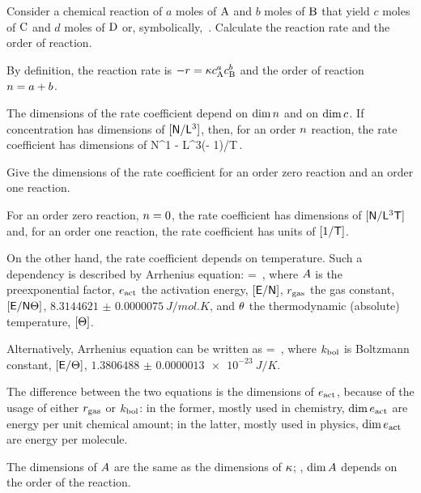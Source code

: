 \begin{example}
Consider a chemical reaction of $a$ moles of $\ce A$ and $b$ moles of $\ce B$ that yield $c$ moles of $\ce C$ and $d$ moles of $\ce D$ or, symbolically,
\beq
{}\,.
\eeq
Calculate the reaction rate and the order of reaction.
\end{example}

\begin{solution}
By definition, the reaction rate is $-\rrate = \krcoeff\conc A^a\conc B^b$ and the order of reaction $n = a + b$.
\end{solution}

The dimensions of the rate coefficient depend on $\dim n$ and on $\dim\conc{}$. If concentration has dimensions of $[\mathsf{N}/\mathsf{L}^3]$, then, for an order $n$ reaction, the rate coefficient has dimensions of 
\beq
\phdim N^{1 - \rorder}\phdim L^{3(\rorder - 1)}/\phdim T\,.
\eeq

\begin{example}
Give the dimensions of the rate coefficient for an order zero reaction and an order one reaction.
\end{example}

\begin{solution}
For an order zero reaction, $n = 0$, the rate coefficient has dimensions of $[\mathsf{N}/\mathsf{L}^3\mathsf{T}]$ and, for an order one reaction, the rate coefficient has units of $[1/\mathsf{T}]$.
\end{solution}

On the other hand, the rate coefficient depends on temperature. Such a dependency is described by Arrhenius equation:
\beq
\krcoeff\vat\temp = \freqfact\exp{}\,,
\eeq
where $A$ is the preexponential factor, $e_\text{act}$ the activation energy, $[\mathsf{E}/\mathsf{N}]$, $r_\text{gas}$ the gas constant, $[\mathsf{E}/\mathsf{N}\Theta]$, $\SI{8.3144621(75)}{J/mol.K}$, and $\theta$ the thermodynamic (absolute) temperature, $[\Theta]$.

Alternatively, Arrhenius equation can be written as
\beq
\krcoeff\vat\temp = \freqfact\exp{}\,,
\eeq
where $k_\text{bol}$ is Boltzmann constant, $[\mathsf{E}/\Theta]$, $\SI{1.3806488(13)e-23}{J/K}$.

The difference between the two equations is the dimensions of $e_\text{act}$, because of the usage of either $r_\text{gas}$ or $k_\text{bol}$: in the former, mostly used in chemistry, $\dim e_\text{act}$ are energy per unit chemical amount; in the latter, mostly used in physics, $\dim e_\text{act}$ are energy per molecule.

The dimensions of $A$ are the same as the dimensions of $\kappa$; \ie, $\dim A$ depends on the order of the reaction.
